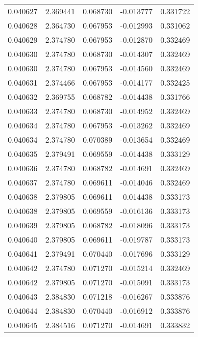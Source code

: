 \begin{tabular}{lrrrr}
0.040627    &  2.369441 &  0.068730 & -0.013777 &             0.331722 \\
0.040628    &  2.364730 &  0.067953 & -0.012993 &             0.331062 \\
0.040629    &  2.374780 &  0.067953 & -0.012870 &             0.332469 \\
0.040630    &  2.374780 &  0.068730 & -0.014307 &             0.332469 \\
0.040630    &  2.374780 &  0.067953 & -0.014560 &             0.332469 \\
0.040631    &  2.374466 &  0.067953 & -0.014177 &             0.332425 \\
0.040632    &  2.369755 &  0.068782 & -0.014438 &             0.331766 \\
0.040633    &  2.374780 &  0.068730 & -0.014952 &             0.332469 \\
0.040634    &  2.374780 &  0.067953 & -0.013262 &             0.332469 \\
0.040634    &  2.374780 &  0.070389 & -0.013654 &             0.332469 \\
0.040635    &  2.379491 &  0.069559 & -0.014438 &             0.333129 \\
0.040636    &  2.374780 &  0.068782 & -0.014691 &             0.332469 \\
0.040637    &  2.374780 &  0.069611 & -0.014046 &             0.332469 \\
0.040638    &  2.379805 &  0.069611 & -0.014438 &             0.333173 \\
0.040638    &  2.379805 &  0.069559 & -0.016136 &             0.333173 \\
0.040639    &  2.379805 &  0.068782 & -0.018096 &             0.333173 \\
0.040640    &  2.379805 &  0.069611 & -0.019787 &             0.333173 \\
0.040641    &  2.379491 &  0.070440 & -0.017696 &             0.333129 \\
0.040642    &  2.374780 &  0.071270 & -0.015214 &             0.332469 \\
0.040642    &  2.379805 &  0.071270 & -0.015091 &             0.333173 \\
0.040643    &  2.384830 &  0.071218 & -0.016267 &             0.333876 \\
0.040644    &  2.384830 &  0.070440 & -0.016912 &             0.333876 \\
0.040645    &  2.384516 &  0.071270 & -0.014691 &             0.333832 \\

\end{tabular}
